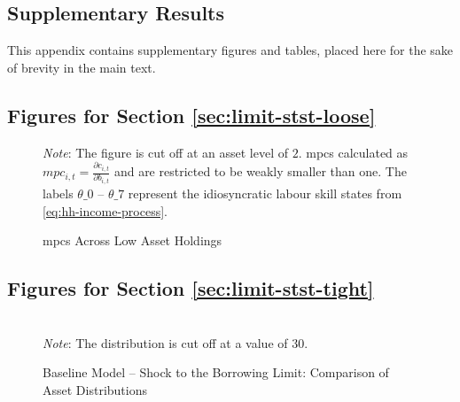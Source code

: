 \documentclass[a4paper,12pt]{article} %
\numberwithin{equation}{section} %
\numberwithin{figure}{section}
\numberwithin{table}{section}
\begin{document}
\begin{refsection}
\begin{appendices}
\section{Supplementary Results}
\label{sec-app:figures}

This appendix contains supplementary figures and tables, placed here for the sake of brevity in the main text.

\subsection{Figures for Section \ref{sec:limit-stst-loose}}
\label{sec-app:figures-limit-loose}

\begin{figure}[H]
    \centering
    \caption{\Gls{mpc}s Across Low Asset Holdings}
    \label{fig:baseline-limit-initial-mpcs}
    

    \vspace{10pt}
    
    \begin{minipage}{0.75\textwidth}
    \footnotesize
    \textit{Note}: The figure is cut off at an asset level of $2$. \Gls{mpc}s calculated as $mpc_{i,t} = \frac{\partial c_{i,t}}{\partial b_{i,t}}$ and are restricted to be weakly smaller than one. The labels $\theta\_0$ -- $\theta\_7$ represent the idiosyncratic labour skill states from \eqref{eq:hh-income-process}.
    \end{minipage}
\end{figure}

\subsection{Figures for Section \ref{sec:limit-stst-tight}}
\label{sec-app:figures-limit-tight}

\begin{sidewaysfigure}
    \caption{Baseline Model -- Shock to the Borrowing Limit: Comparison of Asset Distributions}
    \label{fig:comparison-stst-baseline-dist}
    \centering

    \\
     \centering
	\textit{Note}: The distribution is cut off at a value of $30$.
\end{sidewaysfigure}


\end{appendices}
\end{refsection}
\end{document}
